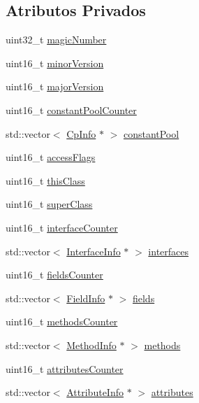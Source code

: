 \subsection*{Atributos Privados}
\begin{DoxyCompactItemize}
\item 
uint32\+\_\+t \hyperlink{class_class_loader_a7442307ca76e7d8a9be304db4e33b66d}{magic\+Number}
\item 
uint16\+\_\+t \hyperlink{class_class_loader_abdd2cd7ba1f788bc38cb337f5ae5b5a5}{minor\+Version}
\item 
uint16\+\_\+t \hyperlink{class_class_loader_a7a02cc0f6fe77ff6e5f9309ab4bc31b5}{major\+Version}
\item 
uint16\+\_\+t \hyperlink{class_class_loader_af45f7e190304e384793dda63d127503f}{constant\+Pool\+Counter}
\item 
std\+::vector$<$ \hyperlink{class_cp_info}{Cp\+Info} $\ast$ $>$ \hyperlink{class_class_loader_a5ed8e2522a4648fee01751f80be2cbd2}{constant\+Pool}
\item 
uint16\+\_\+t \hyperlink{class_class_loader_ab5d88fdb250c1d7b0e315afd32edf2d5}{access\+Flags}
\item 
uint16\+\_\+t \hyperlink{class_class_loader_ab4ec421aef6d619f8e2ae86ea08d62f2}{this\+Class}
\item 
uint16\+\_\+t \hyperlink{class_class_loader_ab15e6151a14afaa40e3f5ff63fa72106}{super\+Class}
\item 
uint16\+\_\+t \hyperlink{class_class_loader_a10b6072e3219bf2c62bde208923a8bd5}{interface\+Counter}
\item 
std\+::vector$<$ \hyperlink{class_interface_info}{Interface\+Info} $\ast$ $>$ \hyperlink{class_class_loader_ae80a739acf39382233e56bac10559a5b}{interfaces}
\item 
uint16\+\_\+t \hyperlink{class_class_loader_a6a2f6f9c57e378dd5c36f6bb61116ce3}{fields\+Counter}
\item 
std\+::vector$<$ \hyperlink{class_field_info}{Field\+Info} $\ast$ $>$ \hyperlink{class_class_loader_a4f4f63df7b9b46194c9f843de8b2cdfd}{fields}
\item 
uint16\+\_\+t \hyperlink{class_class_loader_a68f4e0b040607cea6a56960ed05ae364}{methods\+Counter}
\item 
std\+::vector$<$ \hyperlink{struct_method_info}{Method\+Info} $\ast$ $>$ \hyperlink{class_class_loader_a003398daa2f1cb3e48c6efbd1a273b17}{methods}
\item 
uint16\+\_\+t \hyperlink{class_class_loader_a0d223edb7107eaa9824fdee870944d9b}{attributes\+Counter}
\item 
std\+::vector$<$ \hyperlink{class_attribute_info}{Attribute\+Info} $\ast$ $>$ \hyperlink{class_class_loader_a1b9e4949bbf3a2bf2e0c7b830044c653}{attributes}
\end{DoxyCompactItemize}


